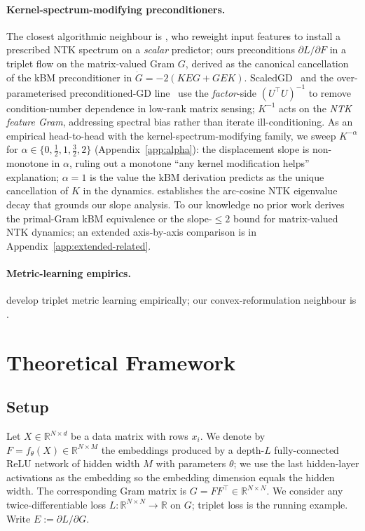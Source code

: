 \documentclass{article}
\newcommand{\R}{\mathbb{R}}
\newcommand{\E}{E}
\begin{document}
\paragraph{Kernel-spectrum-modifying preconditioners.}
The closest algorithmic neighbour is \citet{amir2023controlling}, who
reweight input features to install a prescribed NTK spectrum on a
\emph{scalar} predictor; ours preconditions
$\partial L / \partial F$ in a triplet flow on the matrix-valued Gram
$G$, derived as the canonical cancellation of the kBM preconditioner
in $\dot G = -2(KEG + GEK)$. ScaledGD~\citep{tong2021accelerating}
and the over-parameterised preconditioned-GD
line~\citep{xu2023power} use the \emph{factor}-side $(U^\top U)^{-1}$
to remove condition-number dependence in low-rank matrix sensing;
$K^{-1}$ acts on the \emph{NTK feature Gram}, addressing spectral
bias rather than iterate ill-conditioning. As an empirical
head-to-head with the kernel-spectrum-modifying family, we sweep
$K^{-\alpha}$ for $\alpha \in \{0, \tfrac{1}{2}, 1, \tfrac{3}{2}, 2\}$
(Appendix~\ref{app:alpha}): the displacement slope is non-monotone in
$\alpha$, ruling out a monotone ``any kernel modification helps''
explanation; $\alpha\!=\!1$ is the value the kBM derivation predicts
as the unique cancellation of $K$ in the dynamics.
\citet{bach2017breaking} establishes the arc-cosine NTK eigenvalue
decay that grounds our slope analysis. To our knowledge no prior
work derives the primal-Gram kBM equivalence or the slope-$\leq 2$
bound for matrix-valued NTK dynamics; an extended axis-by-axis
comparison is in Appendix~\ref{app:extended-related}.

\paragraph{Metric-learning empirics.}
\citet{schroff2015facenet,weinberger2009distance,movshovitz2017no,wang2017deep}
develop triplet metric learning empirically; our convex-reformulation
neighbour is \citet{pilanci2020neural}.

\section{Theoretical Framework}
\label{sec:theory}

\subsection{Setup}

Let $X \in \R^{N \times d}$ be a data matrix with rows $x_i$. We denote by
$F = f_\theta(X) \in \R^{N \times M}$ the embeddings produced by a depth-$L$
fully-connected ReLU network of hidden width $M$ with parameters
$\theta$; we use the last hidden-layer activations as the embedding so
the embedding dimension equals the hidden width. The corresponding Gram
matrix is $G = FF^\top \in \R^{N \times N}$. We
consider any twice-differentiable loss $L : \R^{N \times N} \to \R$ on $G$;
triplet loss is the running example. Write $\E := \partial L / \partial G$.
\end{document}
